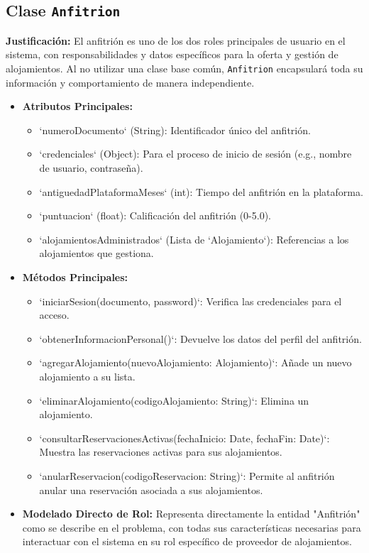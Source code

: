 \documentclass[journal]{IEEEtran}
\begin{document}
\subsection{Clase \texttt{Anfitrion}}
\textbf{Justificación:} El anfitrión es uno de los dos roles principales de usuario en el sistema, con responsabilidades y datos específicos para la oferta y gestión de alojamientos. Al no utilizar una clase base común, \texttt{Anfitrion} encapsulará toda su información y comportamiento de manera independiente.
\begin{itemize}
    \item \textbf{Atributos Principales:}
        \begin{itemize}
            \item `numeroDocumento` (String): Identificador único del anfitrión.
            \item `credenciales` (Object): Para el proceso de inicio de sesión (e.g., nombre de usuario, contraseña).
            \item `antiguedadPlataformaMeses` (int): Tiempo del anfitrión en la plataforma.
            \item `puntuacion` (float): Calificación del anfitrión (0-5.0).
            \item `alojamientosAdministrados` (Lista de `Alojamiento`): Referencias a los alojamientos que gestiona.
        \end{itemize}
    \item \textbf{Métodos Principales:}
        \begin{itemize}
            \item `iniciarSesion(documento, password)`: Verifica las credenciales para el acceso.
            \item `obtenerInformacionPersonal()`: Devuelve los datos del perfil del anfitrión.
            \item `agregarAlojamiento(nuevoAlojamiento: Alojamiento)`: Añade un nuevo alojamiento a su lista.
            \item `eliminarAlojamiento(codigoAlojamiento: String)`: Elimina un alojamiento.
            \item `consultarReservacionesActivas(fechaInicio: Date, fechaFin: Date)`: Muestra las reservaciones activas para sus alojamientos.
            \item `anularReservacion(codigoReservacion: String)`: Permite al anfitrión anular una reservación asociada a sus alojamientos.
        \end{itemize}
    \item \textbf{Modelado Directo de Rol:} Representa directamente la entidad "Anfitrión" como se describe en el problema, con todas sus características necesarias para interactuar con el sistema en su rol específico de proveedor de alojamientos.
\end{itemize}
\end{document}
